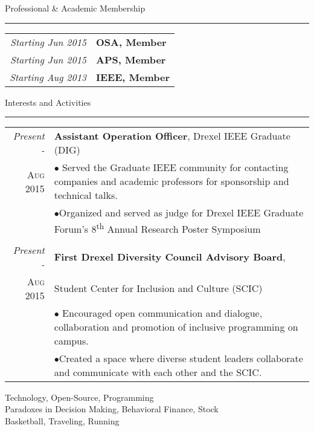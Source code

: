 \begin{vita}
{\Large\scshape\raggedright{Professional \& Academic Membership}}
\newline
\rule{\textwidth}{1pt}
\begin{tabular}{rl} 
\emph{Starting Jun 2015} & \textbf{OSA, Member}\\
\emph{Starting Jun 2015} & \textbf{APS, Member}\\
\emph{Starting Aug 2013} & \textbf{IEEE, Member}\\
\end{tabular}

\newpage
{\Large\scshape\raggedright{Interests and Activities}}
\newline
\rule{\textwidth}{1pt}
\begin{tabular}{r|p{11cm}}  
\emph{Present -} & \textbf{Assistant Operation Officer}, Drexel IEEE Graduate (DIG) \\
\textsc{Aug} 2015 & \footnotesize{$\bullet$ Served the Graduate IEEE community for contacting companies and academic professors for sponsorship and technical talks.} \\
& \footnotesize{$\bullet$Organized and served as judge for Drexel IEEE Graduate Forum's 8\textsuperscript{th} Annual Research Poster Symposium }\\
 \multicolumn{2}{c}{} \\
\emph{Present -} & \textbf{First Drexel Diversity Council Advisory Board}, \\ 
\textsc{Aug} 2015 & Student Center for Inclusion and Culture (SCIC)\\
& \footnotesize{$\bullet$ Encouraged open communication and dialogue, collaboration and promotion of inclusive programming on campus.} \\
& \footnotesize{$\bullet$Created a space where diverse student leaders collaborate and communicate with each other and the SCIC.} \\
\end{tabular}
\vspace{5mm}

Technology, Open-Source, Programming\\
Paradoxes in Decision Making, Behavioral Finance, Stock\\
Basketball, Traveling, Running

\end{vita}
